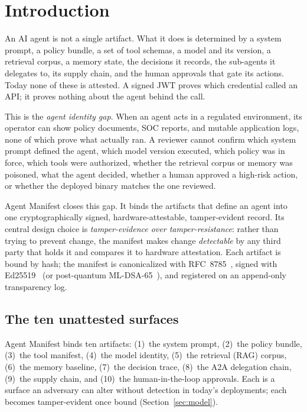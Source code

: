 \section{Introduction}
\label{sec:intro}

An AI agent is not a single artifact. What it does is determined by a system prompt,
a policy bundle, a set of tool schemas, a model and its version, a retrieval corpus,
a memory state, the decisions it records, the sub-agents it delegates to, its supply
chain, and the human approvals that gate its actions. Today none of these is
attested. A signed JWT proves which credential called an API; it proves nothing about
the agent behind the call.

This is the \emph{agent identity gap}. When an agent acts in a regulated environment,
its operator can show policy documents, SOC reports, and mutable application logs,
none of which prove what actually ran. A reviewer cannot confirm which system prompt
defined the agent, which model version executed, which policy was in force, which
tools were authorized, whether the retrieval corpus or memory was poisoned, what the
agent decided, whether a human approved a high-risk action, or whether the deployed
binary matches the one reviewed.

Agent Manifest closes this gap. It binds the artifacts that define an agent into one
cryptographically signed, hardware-attestable, tamper-evident record. Its central
design choice is \emph{tamper-evidence over tamper-resistance}: rather than trying to
prevent change, the manifest makes change \emph{detectable} by any third party that
holds it and compares it to hardware attestation. Each artifact is bound by hash;
the manifest is canonicalized with RFC~8785~\citep{jcs8785}, signed with
Ed25519~\citep{eddsa8032} (or post-quantum ML-DSA-65~\citep{mldsa204}), and registered
on an append-only transparency log.

\subsection*{The ten unattested surfaces}

Agent Manifest binds ten artifacts: (1)~the system prompt, (2)~the policy bundle,
(3)~the tool manifest, (4)~the model identity, (5)~the retrieval (RAG) corpus,
(6)~the memory baseline, (7)~the decision trace, (8)~the A2A delegation chain,
(9)~the supply chain, and (10)~the human-in-the-loop approvals. Each is a surface an
adversary can alter without detection in today's deployments; each becomes
tamper-evident once bound (Section~\ref{sec:model}).


